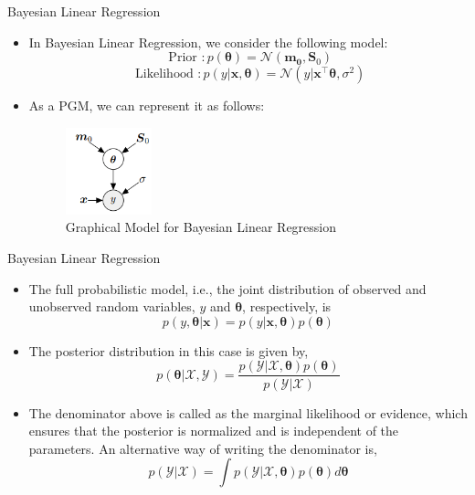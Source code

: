 \documentclass{beamer}
\begin{document}
\begin{frame}{Bayesian Linear Regression}
\begin{itemize}[<+->]
\item In Bayesian Linear Regression, we consider the following model:
\begin{equation*}
\text{ Prior }: p(\boldsymbol{\theta}) = \mathcal{N}(\boldsymbol{m_{0}}, \boldsymbol{S}_{0})
\end{equation*}
\begin{equation*}
\text{ Likelihood }: p(y | \boldsymbol{x}, \boldsymbol{\theta}) = \mathcal{N}(y | \boldsymbol{x}^{\top}\boldsymbol{\theta}, \sigma^{2})
\end{equation*}
\item As a PGM, we can represent it as follows:
\begin{figure}[htp]
\centering
\includegraphics[width=2.5cm]{figures/blrpgm.png}
\caption{Graphical Model for Bayesian Linear Regression}
\label{fig:blrpgm}
\end{figure}

\end{itemize}

\end{frame}



\begin{frame}{Bayesian Linear Regression}
\begin{itemize}[<+->]
\item The full probabilistic model, i.e., the joint distribution of observed and unobserved random variables, $y$ and $\boldsymbol{\theta}$, respectively, is
\begin{equation*}
p(y, \boldsymbol{\theta}|\boldsymbol{x}) = p(y|\boldsymbol{x, \theta})p(\boldsymbol{\theta})
\end{equation*}


\item The posterior distribution in this case is given by,
\begin{equation*}
p(\boldsymbol{\theta} | \mathcal{X}, \mathcal{Y})=\frac{p(\mathcal{Y} | \mathcal{X}, \boldsymbol{\theta}) p(\boldsymbol{\theta})}{p(\mathcal{Y} | \mathcal{X})}
\end{equation*}
\item The denominator above is called as the marginal likelihood or evidence, which ensures that the posterior is normalized and is independent of the parameters. An alternative way of writing the denominator is, 
\begin{equation*}
p(\mathcal{Y | X}) = \int p(\mathcal{Y | X}, \boldsymbol{\theta})p(\boldsymbol{\theta})d\boldsymbol{\theta}
\end{equation*}
\end{itemize}
\end{frame}
\end{document}

